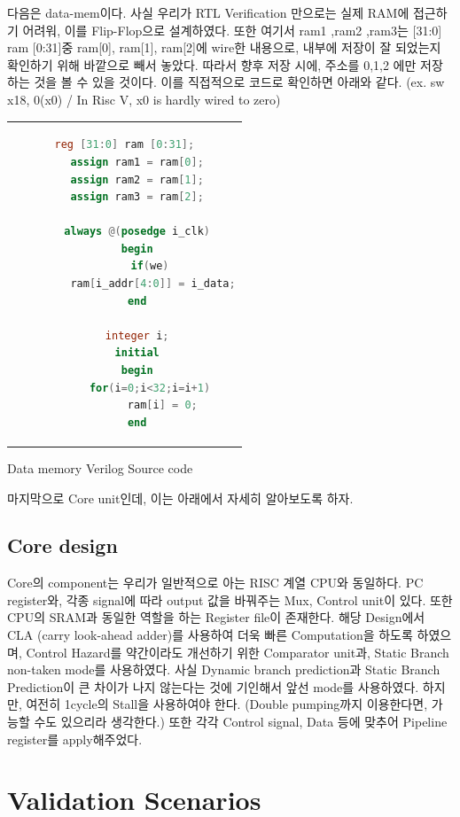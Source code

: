 \documentclass[oneside]{article}
\begin{document}
다음은 data-mem이다. 사실 우리가 RTL Verification 만으로는 실제 RAM에 접근하기 어려워, 이를 Flip-Flop으로 설계하였다. 또한 여기서 ram1 ,ram2 ,ram3는 [31:0] ram [0:31]중 ram[0], ram[1], ram[2]에 wire한 내용으로, 내부에 저장이 잘 되었는지 확인하기 위해 바깥으로 빼서 놓았다. 따라서 향후 저장 시에, 주소를 0,1,2 에만 저장하는 것을 볼 수 있을 것이다. 이를 직접적으로 코드로 확인하면 아래와 같다.  (ex. sw x18, 0(x0) /  In Risc V, x0 is hardly wired to zero)\\ 
\begin{center}
\begin{tabular}{c}
\begin{lstlisting}[language=Verilog]
   reg [31:0] ram [0:31];
    assign ram1 = ram[0];
    assign ram2 = ram[1];
    assign ram3 = ram[2];
    
    always @(posedge i_clk)
    begin
        if(we)
         ram[i_addr[4:0]] = i_data;
    end
    
    integer i;
    initial
    begin
        for(i=0;i<32;i=i+1)
            ram[i] = 0;
    end
\end{lstlisting}
\end{tabular}
\end{center}
\begin{center}
Data memory Verilog Source code
\end{center}
마지막으로 Core unit인데, 이는 아래에서 자세히 알아보도록 하자.

\subsection{Core design}
Core의 component는 우리가 일반적으로 아는 RISC 계열 CPU와 동일하다. PC register와, 각종 signal에 따라 output 값을 바꿔주는 Mux, Control unit이 있다. 또한 CPU의 SRAM과 동일한 역할을 하는 Register file이 존재한다. 해당 Design에서 CLA (carry look-ahead adder)를 사용하여 더욱 빠른 Computation을 하도록 하였으며, Control Hazard를 약간이라도 개선하기 위한 Comparator unit과, Static Branch non-taken mode를 사용하였다. 사실 Dynamic branch prediction과 Static Branch Prediction이 큰 차이가 나지 않는다는 것에 기인해서 앞선 mode를 사용하였다. 하지만, 여전히 1cycle의 Stall을 사용하여야 한다. (Double pumping까지 이용한다면, 가능할 수도 있으리라 생각한다.) 또한 각각 Control signal, Data 등에 맞추어 Pipeline register를 apply해주었다.

\section{Validation Scenarios}
\end{document}
